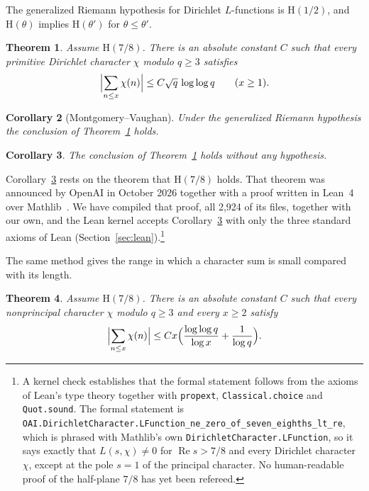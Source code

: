 \documentclass[11pt]{amsart}
\newtheorem{theorem}{Theorem}
\newtheorem{corollary}[theorem]{Corollary}
\theoremstyle{definition}
\theoremstyle{remark}
\numberwithin{equation}{section}
\newcommand{\R}{\operatorname{Re}}
\begin{document}
The generalized Riemann hypothesis for Dirichlet $L$-functions is
$\mathrm H(1/2)$, and $\mathrm H(\theta)$ implies $\mathrm H(\theta')$ for
$\theta\le\theta'$.

\begin{theorem}\label{thm:main}
Assume $\mathrm H(7/8)$. There is an absolute constant $C$ such that every
primitive Dirichlet character $\chi$ modulo $q\ge3$ satisfies
\[
\Bigl|\sum_{n\le x}\chi(n)\Bigr|\le C\sqrt q\,\log\log q\qquad(x\ge1).
\]
\end{theorem}

\begin{corollary}[Montgomery--Vaughan]\label{cor:grh}
Under the generalized Riemann hypothesis the conclusion of
Theorem~\textup{\ref{thm:main}} holds.
\end{corollary}

\begin{corollary}\label{cor:uncond}
The conclusion of Theorem~\textup{\ref{thm:main}} holds without any
hypothesis.
\end{corollary}

Corollary~\ref{cor:uncond} rests on the theorem that $\mathrm H(7/8)$ holds.
That theorem was announced by OpenAI in October 2026 together with a proof
written in Lean~4 over Mathlib~\cite{openai}. We have compiled that proof,
all 2,924 of its files, together with our own, and the Lean kernel accepts
Corollary~\ref{cor:uncond} with only the three standard axioms of Lean
(Section~\ref{sec:lean}).\footnote{A kernel check establishes that the
formal statement follows from the axioms of Lean's type theory together with
\texttt{propext}, \texttt{Classical.choice} and \texttt{Quot.sound}. The formal
statement is
\texttt{OAI.DirichletCharacter.LFunction\_ne\_zero\_of\_seven\_eighths\_lt\_re},
which is phrased with Mathlib's own \texttt{DirichletCharacter.LFunction}, so it
says exactly that $L(s,\chi)\ne0$ for $\R s>7/8$ and every Dirichlet character
$\chi$, except at the pole $s=1$ of the principal character. No human-readable
proof of the half-plane $7/8$ has yet been refereed.}

The same method gives the range in which a character sum is small compared
with its length.

\begin{theorem}\label{thm:range}
Assume $\mathrm H(7/8)$. There is an absolute constant $C$ such that every
nonprincipal character $\chi$ modulo $q\ge3$ and every $x\ge2$ satisfy
\[
\Bigl|\sum_{n\le x}\chi(n)\Bigr|\le Cx\Bigl(\frac{\log\log q}{\log x}+\frac1{\log
q}\Bigr).
\]
\end{theorem}
\end{document}

